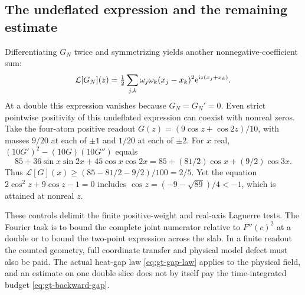 \subsection{The undeflated expression and the remaining estimate}

Differentiating \(G_N\) twice and symmetrizing yields another
nonnegative-coefficient sum:
\[
 \mathcal L[G_N](z)=\tfrac12\sum_{j,k}\omega_j\omega_k
           (x_j-x_k)^2\mathrm e^{\mathrm i z(x_j+x_k)} .
\]
At a double this expression vanishes because \(G_N=G_N'=0\).
Even strict pointwise positivity of this undeflated expression
can coexist with nonreal zeros. Take the four-atom positive readout
\(G(z)=(9\cos z+\cos 2z)/10\), with masses \(9/20\) at each
of \(\pm1\) and \(1/20\) at each of \(\pm2\).
For \(x\) real, \((10G')^2-(10G)(10G'')\) equals
\[
 85+36\sin x\sin 2x+45\cos x\cos 2x
  =85+(81/2)\cos x+(9/2)\cos 3x .
\]
Thus \(\mathcal L[G](x)\ge(85-81/2-9/2)/100=2/5\).
Yet the equation \(2\cos^2 z+9\cos z-1=0\) includes
\(\cos z=(-9-\sqrt{89})/4<-1\), which is attained at nonreal \(z\).

These controls delimit the finite positive-weight and real-axis
Laguerre tests. The Fourier task is to bound the complete joint
numerator relative to \(F''(c)^2\) at a double or to bound the
two-point expression across the slab. In a finite readout the
counted geometry, full coordinate transfer and physical model
defect must also be paid. The actual heat-gap law
\eqref{eq:gt-gap-law} applies to the physical field, and an
estimate on one double slice does not by itself pay the
time-integrated budget \eqref{eq:gt-backward-gap}.
